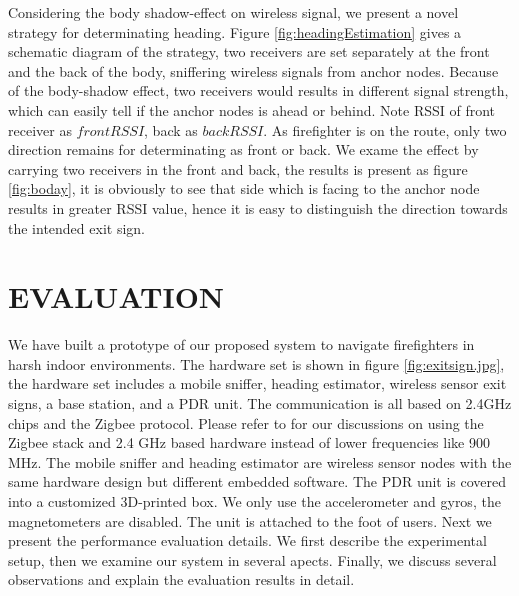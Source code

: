 \documentclass[conference]{IEEEtran}
\begin{document}
    Considering the body shadow-effect on wireless signal, we present a novel strategy for determinating heading. Figure \ref{fig:headingEstimation} gives a schematic diagram of the strategy, two receivers are set separately at the front and the back of the body, sniffering wireless signals from anchor nodes. Because of the body-shadow effect, two receivers would results in different signal strength, which can easily tell if the anchor nodes is ahead or behind. Note RSSI of front receiver as $frontRSSI$, back as $backRSSI$. As firefighter is on the route, only two direction remains for determinating as front or back. We exame the effect by carrying two receivers in the front and back, the results is present as figure \ref{fig:boday}, it is obviously to see that side which is facing to the anchor node results in greater RSSI value, hence it is easy to distinguish the  direction towards the intended exit sign.

  \section{EVALUATION}

   We have built a prototype of our proposed system to navigate firefighters in harsh indoor environments. The hardware set is shown in figure \ref{fig:exitsign.jpg}, the hardware set includes a mobile sniffer, heading estimator, wireless sensor exit signs, a base station, and a PDR unit. The communication is all based on 2.4GHz chips and the Zigbee protocol. Please refer to \cite{liu2010automatic} for our discussions on using the Zigbee stack and 2.4 GHz based hardware instead of lower frequencies like 900 MHz. The mobile sniffer and heading estimator are wireless sensor nodes with the same hardware design but different embedded software. The PDR unit is covered into a customized 3D-printed box. We only use the accelerometer and gyros, the magnetometers are disabled. The unit is attached to the foot of users. Next we present the performance evaluation details. We first describe the experimental setup, then we examine our system in several apects. Finally, we discuss several observations and explain the evaluation results in detail.
   
\end{document}
